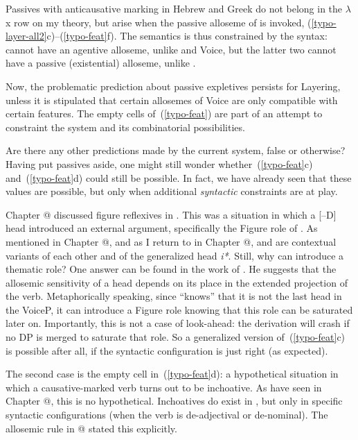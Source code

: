 Passives with anticausative marking in Hebrew and Greek do not belong in the $\lambda$x row on my theory, but arise when the passive alloseme of {\vd} is invoked, (\ref{typo-layer-all2}c)--(\ref{typo-feat}f). The semantics is thus constrained by the syntax: {\vz} cannot have an agentive alloseme, unlike {\vd} and Voice, but the latter two cannot have a passive (existential) alloseme, unlike {\vz}. %

Now, the problematic prediction about passive expletives persists for Layering, unless it is stipulated that certain allosemes of Voice are only compatible with certain features. The empty cells of~(\ref{typo-feat}) are part of an attempt to constraint the system and its combinatorial possibilities.

Are there any other predictions made by the current system, false or otherwise? Having put passives aside, one might still wonder whether~(\ref{typo-feat}c) and~(\ref{typo-feat}d) could still be possible. In fact, we have already seen that these values are possible, but only when additional \emph{syntactic} constraints are at play.

Chapter @ discussed figure reflexives in {\tnif}. This was a situation in which a [--D] head introduced an external argument, specifically the Figure role of {\pz}. As mentioned in Chapter @, and as I return to in Chapter @, {\pz} and {\vz} are contextual variants of each other and of the generalized head \emph{i*}. Still, why can {\pz} introduce a thematic role? One answer can be found in the work of \cite{wood15springer}. He suggests that the allosemic sensitivity of a head depends on its place in the extended projection of the verb. Metaphorically speaking, since {\pz} ``knows'' that it is not the last head in the VoiceP, it can introduce a Figure role knowing that this role can be saturated later on. Importantly, this is not a case of look-ahead: the derivation will crash if no DP is merged to saturate that role. So a generalized version of~(\ref{typo-feat}c) is possible after all, if the syntactic configuration is just right (as expected).

The second case is the empty cell in~(\ref{typo-feat}d): a hypothetical situation in which a causative-marked verb turns out to be inchoative. As have seen in Chapter @, this is no hypothetical. Inchoatives do exist in {\thif}, but only in specific syntactic configurations (when the verb is de-adjectival or de-nominal). The allosemic rule in @ stated this explicitly.

